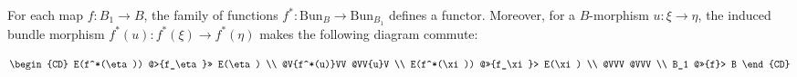 For each map $f: B_1 \to B$, the family of functions $f^*: \mathrm{Bun}_B \to \mathrm{Bun}_{B_1}$ defines a functor. Moreover, for a $B$-morphism $u: \xi \to \eta$, the induced bundle morphism $f^*(u): f^*(\xi) \to f^*(\eta)$ makes the following diagram commute:

$$\begin{CD}
E(f^*(\eta)) @>{f_\eta}>> E(\eta) \\
@V{f^*(u)}VV @VV{u}V \\
E(f^*(\xi)) @>>{f_\xi}> E(\xi) \\
@VVV @VVV \\
B_1 @>>{f}> B
\end{CD}$$
